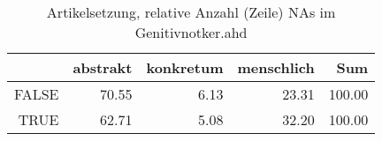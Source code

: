 \begin{table}[ht]
\centering
\begin{tabular}{rrrrr}
  \hline
 & abstrakt & konkretum & menschlich & Sum \\ 
  \hline
FALSE & 70.55 & 6.13 & 23.31 & 100.00 \\ 
  TRUE & 62.71 & 5.08 & 32.20 & 100.00 \\ 
   \hline
\end{tabular}
\caption{Artikelsetzung, relative Anzahl (Zeile) NAs im Genitivnotker.ahd} 
\end{table}
